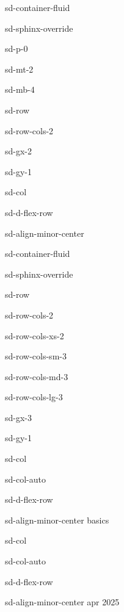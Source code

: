 \documentclass[letterpaper,10pt,italian]{jupyterBook}
\begin{document}
\sphinxstepscope

\begin{sphinxuseclass}{sd-container-fluid}
\begin{sphinxuseclass}{sd-sphinx-override}
\begin{sphinxuseclass}{sd-p-0}
\begin{sphinxuseclass}{sd-mt-2}
\begin{sphinxuseclass}{sd-mb-4}
\begin{sphinxuseclass}{sd-row}
\begin{sphinxuseclass}{sd-row-cols-2}
\begin{sphinxuseclass}{sd-gx-2}
\begin{sphinxuseclass}{sd-gy-1}
\begin{sphinxuseclass}{sd-col}
\begin{sphinxuseclass}{sd-d-flex-row}
\begin{sphinxuseclass}{sd-align-minor-center}
\begin{sphinxuseclass}{sd-container-fluid}
\begin{sphinxuseclass}{sd-sphinx-override}
\begin{sphinxuseclass}{sd-row}
\begin{sphinxuseclass}{sd-row-cols-2}
\begin{sphinxuseclass}{sd-row-cols-xs-2}
\begin{sphinxuseclass}{sd-row-cols-sm-3}
\begin{sphinxuseclass}{sd-row-cols-md-3}
\begin{sphinxuseclass}{sd-row-cols-lg-3}
\begin{sphinxuseclass}{sd-gx-3}
\begin{sphinxuseclass}{sd-gy-1}
\begin{sphinxuseclass}{sd-col}
\begin{sphinxuseclass}{sd-col-auto}
\begin{sphinxuseclass}{sd-d-flex-row}
\begin{sphinxuseclass}{sd-align-minor-center}
\sphinxAtStartPar
basics

\end{sphinxuseclass}
\end{sphinxuseclass}
\end{sphinxuseclass}
\end{sphinxuseclass}
\begin{sphinxuseclass}{sd-col}
\begin{sphinxuseclass}{sd-col-auto}
\begin{sphinxuseclass}{sd-d-flex-row}
\begin{sphinxuseclass}{sd-align-minor-center}
 apr 2025


\end{sphinxuseclass}
\end{sphinxuseclass}
\end{sphinxuseclass}
\end{sphinxuseclass}
\end{sphinxuseclass}
\end{sphinxuseclass}
\end{sphinxuseclass}
\end{sphinxuseclass}
\end{sphinxuseclass}
\end{sphinxuseclass}
\end{sphinxuseclass}
\end{sphinxuseclass}
\end{sphinxuseclass}
\end{sphinxuseclass}
\end{sphinxuseclass}
\end{sphinxuseclass}
\end{sphinxuseclass}
\end{sphinxuseclass}
\end{sphinxuseclass}
\end{sphinxuseclass}
\end{sphinxuseclass}
\end{sphinxuseclass}
\end{sphinxuseclass}
\end{sphinxuseclass}
\end{sphinxuseclass}
\end{sphinxuseclass}
\end{document}
